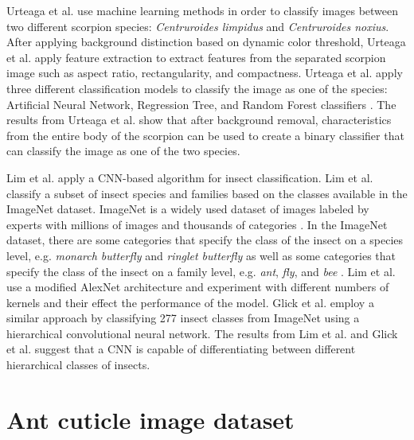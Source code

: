 \documentclass{aci}
\numberwithin{equation}{section}
\begin{document}
Urteaga et al. \cite{urteaga_scorpions_2016} use machine learning methods in
order to classify images between two different scorpion species:
\textit{Centruroides limpidus} and \textit{Centruroides noxius}. After applying
background distinction based on dynamic color threshold, Urteaga et al.
\cite{urteaga_scorpions_2016} apply feature extraction to extract features from
the separated scorpion image such as aspect ratio, rectangularity, and
compactness. Urteaga et al. \cite{urteaga_scorpions_2016} apply three different
classification models to classify the image as one of the species: Artificial
Neural Network, Regression Tree, and Random Forest classifiers
\cite{urteaga_scorpions_2016}. The results from Urteaga et al.
\cite{urteaga_scorpions_2016} show that after background removal,
characteristics from the entire body of the scorpion can be used to create a
binary classifier that can classify the image as one of the two species.

Lim et al. \cite{lim_performance_2017} apply a CNN-based algorithm for insect
classification. Lim et al. \cite{lim_performance_2017} classify a subset of
insect species and families based on the classes available in the ImageNet
dataset. ImageNet is a widely used dataset of images labeled by experts with
millions of images and thousands of categories \cite{deng_imagenet_2009}. In the
ImageNet dataset, there are some categories that specify the class of the insect
on a species level, e.g. \textit{monarch butterfly} and \textit{ringlet
    butterfly} as well as some categories that specify the class of the insect on a
family level, e.g. \textit{ant}, \textit{fly}, and \textit{bee}
\cite{deng_imagenet_2009}. Lim et al. \cite{lim_performance_2017} use a modified
AlexNet architecture and experiment with different numbers of kernels and their
effect the performance of the model. Glick et al. \cite{glick_insect_2016}
employ a similar approach by classifying 277 insect classes from ImageNet using
a hierarchical convolutional neural network. The results from Lim et al.
\cite{lim_performance_2017} and Glick et al. \cite{glick_insect_2016} suggest
that a CNN is capable of differentiating between different hierarchical classes
of insects.

\section{Ant cuticle image dataset}

\end{document}
